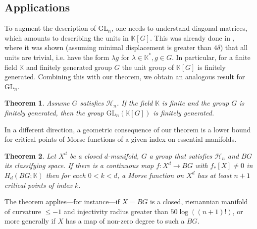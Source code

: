 \documentclass[11pt,letterpaper]{amsart}
\newtheorem{theorem}{Theorem}
\begin{document}
\subsection*{Applications}
To augment the description of $\mathrm{GL}_n$, one needs to understand diagonal matrices, which amounts to describing the units in $\mathbb K[G]$. This was already done in \cite{delzant}, where it was shown (assuming %
minimal displacement is greater than $4\delta$) that all units are trivial, i.e. have the form $\lambda g$ for $\lambda\in\mathbb K^*,g\in G$. In particular, for a finite field $\mathbb K$ and finitely generated group $G$ the unit group of $\mathbb K[G]$ is finitely generated. Combining this with our theorem, we obtain an analogous result for $\mathrm{GL}_n$.
\begin{theorem}
\label{fg}
Assume $G$ satisfies $\mathcal H_{n}$. If the field $\mathbb K$ is finite and the group $G$ is finitely generated, then the group $\mathrm{GL}_n(\mathbb K[G])$ is finitely generated. 
\end{theorem}
In a different direction, a geometric consequence of our theorem is a lower bound for critical points of Morse functions of a given index on essential manifolds.
\begin{theorem}
\label{manifold}
Let $X^d$ be a closed $d$-manifold, $G$ a group that satisfies $\mathcal H_{n}$ and $BG$ its classifying space. If there is a continuous map $f:X^d\rightarrow BG$ with $f_*[X]\not=0$ in $H_d(BG;\mathbb K)$ then for each $0<k<d$, a Morse function on $X^d$ has at least $n+1$ critical points of index $k$.  
\end{theorem}
The theorem applies---for instance---if $X=BG$ is a closed, riemannian manifold of curvature $\leq -1$ and injectivity radius greater than $50\log((n+1)!)$, or more generally if $X$ has a map of non-zero degree to such a $BG$. 
\end{document}
